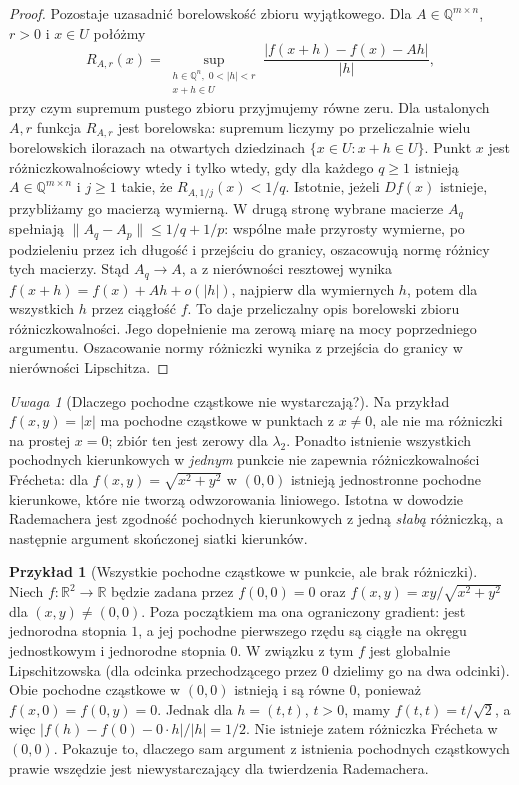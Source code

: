 \documentclass[11pt,a4paper,oneside]{book}
\numberwithin{equation}{chapter}
\theoremstyle{plain}
\theoremstyle{definition}
\newtheorem{przyklad}[twierdzenie]{Przykład}
\theoremstyle{remark}
\newtheorem{uwaga}[twierdzenie]{Uwaga}
\begin{document}
\begin{proof}
Pozostaje uzasadnić borelowskość zbioru wyjątkowego.
Dla $A\in\mathbb Q^{m\times n}$, $r>0$ i $x\in U$
połóżmy
\[
 R_{A,r}(x)=\sup_{\substack{h\in\mathbb Q^n,\;0<|h|<r\\
                                    x+h\in U}}
 \frac{|f(x+h)-f(x)-Ah|}{|h|},
\]
przy czym supremum pustego zbioru przyjmujemy równe
zeru. Dla ustalonych $A,r$ funkcja $R_{A,r}$ jest
borelowska: supremum liczymy po przeliczalnie wielu
borelowskich ilorazach na otwartych dziedzinach
$\{x\in U:x+h\in U\}$.
Punkt $x$ jest różniczkowalnościowy wtedy i tylko wtedy,
gdy dla każdego $q\ge1$ istnieją
$A\in\mathbb Q^{m\times n}$ i $j\ge1$ takie, że
$R_{A,1/j}(x)<1/q$. Istotnie, jeżeli $Df(x)$ istnieje,
przybliżamy go macierzą wymierną. W drugą stronę
wybrane macierze $A_q$ spełniają
$\|A_q-A_p\|\le1/q+1/p$:
wspólne małe przyrosty wymierne, po podzieleniu przez
ich długość i przejściu do granicy, oszacowują normę
różnicy tych macierzy. Stąd $A_q\to A$, a z nierówności
resztowej wynika $f(x+h)=f(x)+Ah+o(|h|)$, najpierw
dla wymiernych $h$, potem dla wszystkich $h$ przez
ciągłość $f$. To daje przeliczalny opis borelowski
zbioru różniczkowalności. Jego dopełnienie ma zerową
miarę na mocy poprzedniego argumentu.
Oszacowanie normy różniczki wynika z przejścia do
granicy w nierówności Lipschitza.
\end{proof}

\begin{uwaga}[Dlaczego pochodne cząstkowe nie wystarczają?]
Na przykład $f(x,y)=|x|$ ma pochodne cząstkowe
w punktach z $x\ne0$, ale nie ma różniczki na prostej
$x=0$; zbiór ten jest zerowy dla $\lambda_2$.
Ponadto istnienie wszystkich pochodnych kierunkowych
w \emph{jednym} punkcie nie zapewnia różniczkowalności
Frécheta: dla $f(x,y)=\sqrt{x^2+y^2}$ w $(0,0)$
istnieją jednostronne pochodne kierunkowe, które nie
tworzą odwzorowania liniowego. Istotna w dowodzie
Rademachera jest zgodność pochodnych kierunkowych
z jedną \emph{słabą} różniczką, a następnie
argument skończonej siatki kierunków.
\end{uwaga}

\begin{przyklad}[Wszystkie pochodne cząstkowe w punkcie, ale brak różniczki]
Niech $f:\mathbb R^2\to\mathbb R$ będzie zadana przez
$f(0,0)=0$ oraz $f(x,y)=xy/\sqrt{x^2+y^2}$
dla $(x,y)\ne(0,0)$. Poza początkiem ma ona
ograniczony gradient: jest jednorodna stopnia $1$,
a jej pochodne pierwszego rzędu są ciągłe na
okręgu jednostkowym i jednorodne stopnia $0$.
W związku z tym $f$ jest globalnie Lipschitzowska
(dla odcinka przechodzącego przez $0$ dzielimy go
na dwa odcinki). Obie pochodne cząstkowe w $(0,0)$
istnieją i są równe $0$, ponieważ $f(x,0)=f(0,y)=0$.
Jednak dla $h=(t,t)$, $t>0$, mamy
$f(t,t)=t/\sqrt2$, a więc
$|f(h)-f(0)-0\cdot h|/|h|=1/2$.
Nie istnieje zatem różniczka Frécheta w $(0,0)$.
Pokazuje to, dlaczego sam argument z istnienia
pochodnych cząstkowych prawie wszędzie jest
niewystarczający dla twierdzenia Rademachera.
\end{przyklad}
\end{document}
